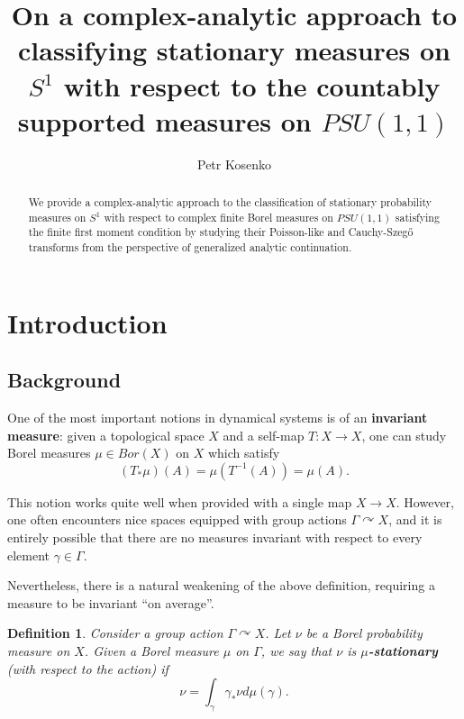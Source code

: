 \documentclass[11pt]{article}
\author{Petr Kosenko}
\title{On a complex-analytic approach to classifying stationary measures on $S^1$ with respect to the countably supported measures on $PSU(1,1)$}
\newtheorem{definition}{Definition}[section]
\begin{document}
\maketitle

\begin{abstract}
We provide a complex-analytic approach to the classification of stationary probability measures on $S^1$ with respect to complex finite Borel measures on $PSU(1,1)$ satisfying the finite first moment condition by studying their Poisson-like and Cauchy-Szeg\H{o} transforms from the perspective of generalized analytic continuation. 

\end{abstract}

\section{Introduction}

\subsection{Background}

One of the most important notions in dynamical systems is of an \textbf{invariant measure}: given a topological space $X$ and a self-map $T : X \rightarrow X$, one can study Borel measures $\mu \in Bor(X)$ on $X$ which satisfy
\begin{equation}
	(T_* \mu)(A) = \mu(T^{-1}(A)) = \mu(A).
\end{equation}

This notion works quite well when provided with a single map $X \rightarrow X$. However, one often encounters nice spaces equipped with group actions $\Gamma \curvearrowright X$, and it is entirely possible that there are no measures invariant with respect to every element $\gamma \in \Gamma$.

Nevertheless, there is a natural weakening of the above definition, requiring a measure to be invariant ``on average''.

\begin{definition}
	Consider a group action $\Gamma \curvearrowright X$. Let $\nu$ be a Borel probability measure on $X$. Given a Borel measure $\mu$ on $\Gamma$, we say that $\nu$ is \textbf{$\mu$-stationary} (with respect to the action) if
	\begin{equation}
		\label{intro: stationary measure}
		\nu = \int_\gamma  \gamma_* \nu d \mu(\gamma).
	\end{equation}
\end{definition}
\end{document}
